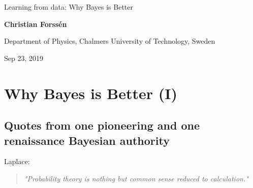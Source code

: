 \documentclass[%
oneside,                 %
final,                   %
10pt]{article}
\begin{document}

\newcommand{\exercisesection}[1]{\subsection*{#1}}







\thispagestyle{empty}

\begin{center}
{\LARGE\bf
\begin{spacing}{1.25}
Learning from data: Why Bayes is Better
\end{spacing}
}
\end{center}


\begin{center}
{\bf Christian Forssén}
\end{center}

    \begin{center}
\centerline{{\small Department of Physics, Chalmers University of Technology, Sweden}}
\end{center}
    

\begin{center}
Sep 23, 2019
\end{center}

\vspace{1cm}


\section{Why Bayes is Better (I)}

\subsection{Quotes from one pioneering and one renaissance Bayesian authority}
Laplace:

\begin{quote}
\emph{"Probability theory is nothing but common sense reduced to calculation."}
\end{quote}
\end{document}
